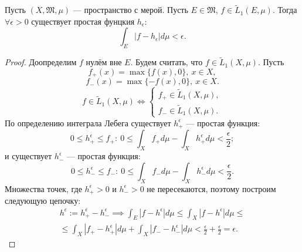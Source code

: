 \begin{lemma}
    Пусть $(X, \mathfrak{M}, \mu)$ — пространство с мерой.
    Пусть $E \in \mathfrak{M}$, $f \in \widetilde{L}_1(E, \mu)$.
    Тогда $\forall \epsilon > 0$ существует простая фунцкия $h_\epsilon$:
    \[\int_E |f - h_\epsilon| d\mu < \epsilon.\]
\end{lemma} 
\begin{proof}
    Доопределим $f$ нулём вне $E$.
    Будем считать, что $f \in \widetilde{L}_1(X, \mu)$.
    Пусть
    \[f_+(x) = \max\{f(x), 0\}, \ x \in X,\]
    \[f_-(x) = \max\{-f(x), 0\}, \ x \in X.\]
    \[f \in \widetilde{L}_1(X, \mu)
    \Longleftrightarrow
    \begin{cases}
        f_+ \in \widetilde{L}_1(X, \mu), \\
        f_- \in \widetilde{L}_1(X, \mu).
    \end{cases}
    \]
    По определению интеграла Лебега существует $h_+^\epsilon$ — простая функция:
    \[0 \leqslant h_+^\epsilon \leqslant f_+: \
    0 \leqslant \int_X f_+ d\mu - \int_X h_+^\epsilon d\mu < \frac{\epsilon}{2};\]
    и существует $h_-^\epsilon$ — простая функция:
    \[0 \leqslant h_-^\epsilon \leqslant f_-: \
    0 \leqslant \int_X f_- d\mu - \int_X h_-^\epsilon d\mu < \frac{\epsilon}{2}.\]
    Множества точек, где $h_+^\epsilon > 0$ и $h_-^\epsilon > 0$ не пересекаются, поэтому построим следующую цепочку:
    \begin{multline*}
        h^\epsilon := h_+^\epsilon - h_-^\epsilon 
        \implies
        \int_E |f - h^\epsilon| d\mu 
        \leqslant
        \int_X |f - h^\epsilon| d\mu
        \leqslant\\\leqslant
        \int_X |f_+ - h_+^\epsilon| d\mu + \int_X |f_- - h_-^\epsilon| d\mu
        <
        \frac{\epsilon}{2} + \frac{\epsilon}{2} = \epsilon.
    \end{multline*} 
\end{proof} 

